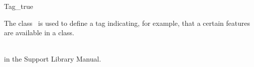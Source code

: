 \begin{ccRefClass}{Tag_true}

\ccDefinition

The class \ccRefName\ is used to define a tag indicating, for example,
that a certain features are available in a class.


\ccSeeAlso
{} \\
 in the Support Library Manual.

\end{ccRefClass}
